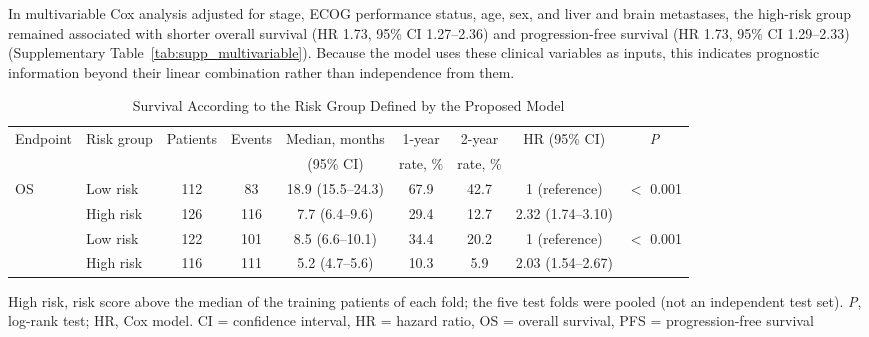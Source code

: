 In multivariable Cox analysis adjusted for stage, ECOG performance status, age, sex, and liver and brain metastases, the high-risk group remained associated with shorter overall survival (HR 1.73, 95\% CI 1.27--2.36) and progression-free survival (HR 1.73, 95\% CI 1.29--2.33) (Supplementary Table~\ref{tab:supp_multivariable}). Because the model uses these clinical variables as inputs, this indicates prognostic information beyond their linear combination rather than independence from them.

\begin{table}[htbp]
\centering
\setlength{\belowcaptionskip}{4pt}
\caption{Survival According to the Risk Group Defined by the Proposed Model}
\label{tab:risk_groups}
\small\setlength{\tabcolsep}{4pt}
\begin{adjustbox}{max width=\textwidth}
\begin{tabular}{@{}ll cc c cc c c@{}}
\toprule
Endpoint & Risk group & Patients & Events & Median, months & 1-year & 2-year & HR (95\% CI) & \textit{P} \\
 & & & & (95\% CI) & rate, \% & rate, \% & & \\
\midrule
\multirow{2}{*}{OS} & Low risk & 112 & 83 & 18.9 (15.5--24.3) & 67.9 & 42.7 & 1 (reference) & \multirow{2}{*}{$<$ 0.001} \\
 & High risk & 126 & 116 & 7.7 (6.4--9.6) & 29.4 & 12.7 & 2.32 (1.74--3.10) &  \\
\addlinespace
\multirow{2}{*}{PFS} & Low risk & 122 & 101 & 8.5 (6.6--10.1) & 34.4 & 20.2 & 1 (reference) & \multirow{2}{*}{$<$ 0.001} \\
 & High risk & 116 & 111 & 5.2 (4.7--5.6) & 10.3 & 5.9 & 2.03 (1.54--2.67) &  \\
\bottomrule
\end{tabular}%
\end{adjustbox}
\par\smallskip
\begin{minipage}{\textwidth}\footnotesize
High risk, risk score above the median of the training patients of each fold; the five test folds were pooled (not an independent test set). \textit{P}, log-rank test; HR, Cox model. CI = confidence interval, HR = hazard ratio, OS = overall survival, PFS = progression-free survival
\end{minipage}
\end{table}

